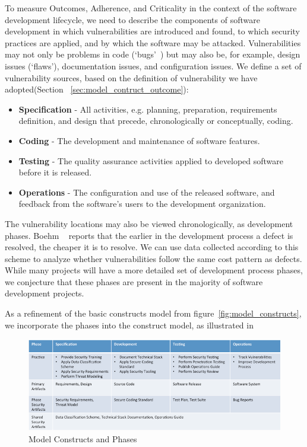 To measure Outcomes, Adherence, and Criticality in the context of the software development lifecycle, we need to describe the components of software development in which vulnerabilities are introduced and found, to which security practices are applied, and by which the software may be attacked.   Vulnerabilities may not only be problems in code (`bugs'~\cite{mcgraw2006software}) but may also be, for example, design issues (`flaws'), documentation issues, and configuration issues. We define a set of vulnerability sources, based on the definition of vulnerability we have adopted(Section ~\ref{sec:model_contruct_outcome}):  
 \begin{itemize}
 	\item \textbf{Specification} - All activities, e.g. planning, preparation, requirements definition, and design that precede, chronologically or conceptually, coding. 
 	\item \textbf{Coding} - The development and maintenance of software features.
 	\item \textbf{Testing} - The quality assurance activities applied to developed software before it is released.
 	\item \textbf{Operations} - The configuration and use of the released software, and feedback from the software's users to the development organization.
 \end{itemize} 
The vulnerability locations may also be viewed chronologically, as development phases. Boehm ~\cite{boehm1981economics} reports that the earlier in the development process a defect is resolved, the cheaper it is to resolve. We can use data collected according to this scheme to analyze whether vulnerabilities follow the same cost pattern as defects. While many projects will have a more detailed set of development process phases, we conjecture that these phases are present in the majority of software development projects.

As a refinement of the basic constructs model from figure~\ref{fig:model_constructs}, we incorporate the phases into the construct model, as illustrated in \label{fig:model_constructs_phases}

\begin{figure}
	\includegraphics[width=\columnwidth]{PracticesDiagram}
	\caption{Model Constructs and Phases}
	\label{fig:model_constructs_phases}
\end{figure}


